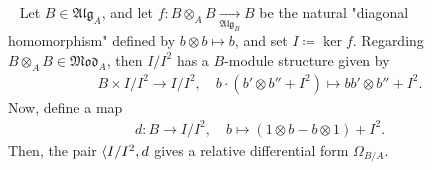 \documentclass[11pt,a4paper,footinclude=true,headinclude=true]{scrbook} %
\newcommand{\<}{\langle}
\let\>\relax
\newcommand{\>}{\rangle}
\newcommand{\MOD}{\mathfrak{Mod}}
\newcommand{\ALG}{\mathfrak{Alg}}
\newenvironment{proposition}[2][]
{\renewcommand\theinnercustomprop{#2}\innercustomprop[#1] 
\begin{mdframed}[backgroundcolor=gray!20]\ }
{\end{mdframed}\endinnercustomprop}
\begin{document}
\begin{proposition}{8.1}
    Let $B\in\ALG_A$, and let $f:B\otimes_AB\xrightarrow[\ALG_B]{} B$ be the natural "diagonal homomorphism" defined by $b\otimes b\mapsto b$, and set $I\coloneqq\ker f$. Regarding $B\otimes_AB\in\MOD_A$, then $I/I^2$ has a $B$-module structure given by
    \begin{align*}
        B\times I/I^2\longrightarrow I/I^2,\quad b\cdot(b'\otimes b''+I^2)\longmapsto bb'\otimes b''+I^2.
    \end{align*}
    Now, define a map 
    \begin{align*}
        d:B\longrightarrow I/I^2,\quad b\longmapsto(1\otimes b-b\otimes1)+I^2.
    \end{align*}
    Then, the pair $\<I/I^2,d\>$ gives a relative differential form $\Omega_{B/A}$.
\end{proposition}
\end{document}
